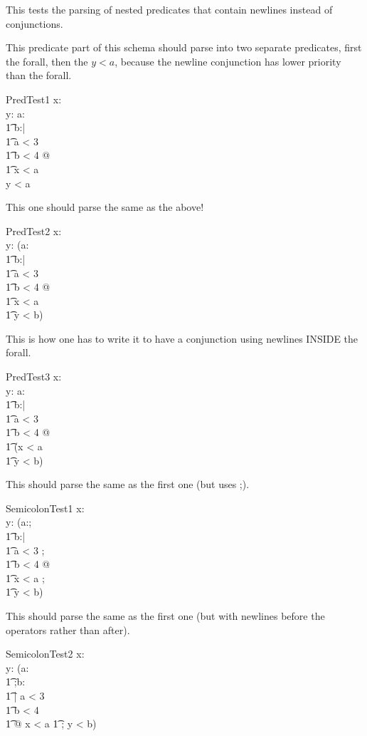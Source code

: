 This tests the parsing of nested predicates that contain newlines
instead of conjunctions.

This predicate part of this schema should parse into
two separate predicates, first the forall, then the $y<a$,
because the newline conjunction has lower priority than the forall.

\begin{schema}{PredTest1}
   x:\nat \\
   y:\nat
\where
   \forall a:\nat \\
   \t1     b:\nat | \\
   \t1     a < 3 \\
   \t1     b < 4 @ \\
   \t1   x < a \\
   y < a
\end{schema}

This one should parse the same as the above!
\begin{schema}{PredTest2}
   x:\nat \\
   y:\nat
\where
   (\forall a:\nat \\
   \t1      b:\nat | \\
   \t1     a < 3 \\
   \t1     b < 4 @ \\
   \t1   x < a \\
   \t1   y < b)
\end{schema}

This is how one has to write it to have a conjunction using newlines
INSIDE the forall.
\begin{schema}{PredTest3}
   x:\nat \\
   y:\nat
\where
   \forall a:\nat \\
   \t1      b:\nat | \\
   \t1     a < 3 \\
   \t1     b < 4 @ \\
   \t1   (x < a \\
   \t1   y < b)
\end{schema}

This should parse the same as the first one (but uses ;).
\begin{schema}{SemicolonTest1}
   x:\nat \\
   y:\nat
\where
   (\forall a:\nat; \\
   \t1      b:\nat | \\
   \t1     a < 3 ; \\
   \t1     b < 4 @ \\
   \t1   x < a ; \\
   \t1   y < b)
\end{schema}

This should parse the same as the first one (but with newlines before
the operators rather than after).
\begin{schema}{SemicolonTest2}
   x:\nat \\
   y:\nat
\where
   (\forall a:\nat \\
   \t1      ;b:\nat \\
   \t1   | a < 3 \\
   \t1     b < 4 \\
   \t1   @ x < a
   \t1   ; y < b)
\end{schema}
